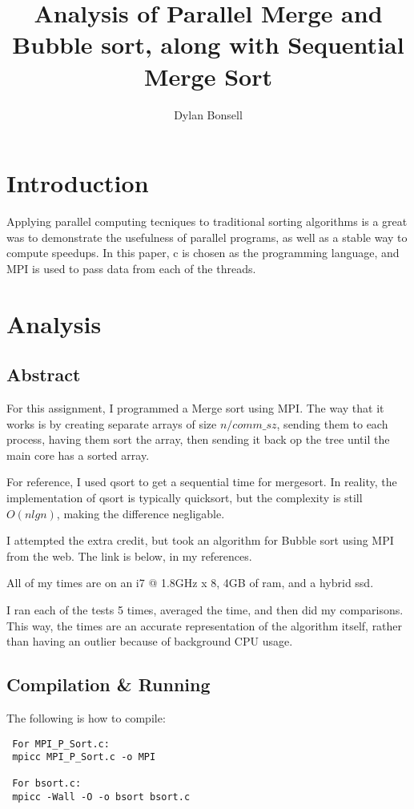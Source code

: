 \documentclass[dvips]{article}
\begin{document}
\title{Analysis of Parallel Merge and Bubble sort, along with Sequential Merge Sort}
 
\author{Dylan Bonsell}
 
\maketitle %
 
\section{Introduction}

Applying parallel computing tecniques to traditional sorting algorithms is a great was to demonstrate the usefulness of parallel programs,
as well as a stable way to compute speedups. In this paper, c is chosen as the programming language, and MPI is used to pass data
from each of the threads.

\section{Analysis}
 
\subsection{Abstract}

For this assignment, I programmed a Merge sort using MPI. The way that it works is by creating separate arrays of 
size $n/comm\_sz$, sending them to each process, having them sort the array, then sending it back op the tree until the main core has a sorted 
array. 

For reference, I used qsort to get a sequential time for mergesort. In reality, the implementation of qsort is typically quicksort, but the 
complexity is still $O(n lg n)$, making the difference negligable.

I attempted the extra credit, but took an algorithm for Bubble sort using MPI from the web. The link is below, in my references.

All of my times are on an i7 @ 1.8GHz x 8, 4GB of ram, and a hybrid ssd.

I ran each of the tests 5 times, averaged the time, and then did my comparisons. This way, the times are an accurate representation of the algorithm itself,
 rather than having an outlier because of background CPU usage. 

\subsection{Compilation \& Running}
 The following is how to compile:
 \begin{verbatim}
 For MPI_P_Sort.c:
 mpicc MPI_P_Sort.c -o MPI

 For bsort.c:
 mpicc -Wall -O -o bsort bsort.c
 \end{verbatim}
\end{document}
